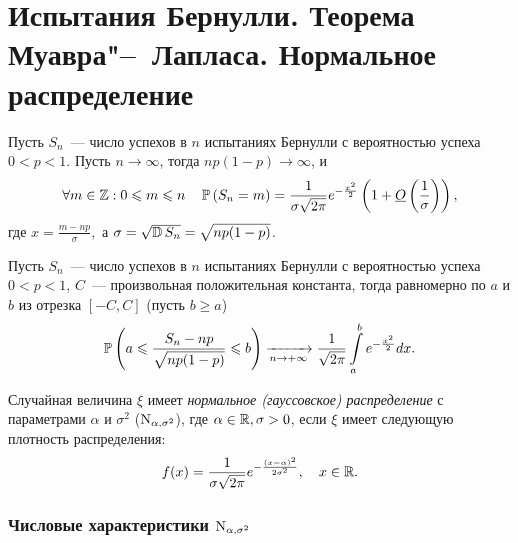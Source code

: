 \section{Испытания Бернулли. Теорема Муавра"--~Лапласа. Нормальное распределение}

\begin{namedthm} 
    Пусть $S_n$~--- число успехов в $n$ испытаниях Бернулли с вероятностью успеха $0 < p < 1$. 
    Пусть $n \to \infty$, тогда $n p(1-p) {\longrightarrow} \infty$, и 
    \begin{equation*}
        \forall m \in \mathbb{Z}: 0 \leqslant m \leqslant n \quad \operatorname{\mathbb{P}}\left(S_{n}=m\right)=\frac{1}{\sigma \sqrt{2 \pi} } e^{-\frac{x^{2}}{2}}\left(1+\underline{O}\left(\frac{1}{\sigma}\right)\right),
    \end{equation*}
    где $x = \frac{m - np}{\sigma},$ а $\sigma=\sqrt{\operatorname{\mathbb{D}} S_{n}}=\sqrt{n p(1-p)}$.
\end{namedthm}  

\begin{namedthm}
    Пусть $S_n$~--- число успехов в $n$ испытаниях Бернулли с вероятностью успеха $0 < p < 1$, $C$~--- произвольная положительная константа, тогда равномерно по $a$ и $b$ из отрезка $[-C,C]$ (пусть $b \geqslant a$)
\begin{equation*}
    \operatorname{\mathbb{P}}\left(a \leqslant \frac{S_{n}-n p}{\sqrt{n p(1-p)}} \leqslant b\right) \xrightarrow[n \to +\infty]{} \frac{1}{\sqrt{2 \pi}} \int\limits_{a}^{b} e^{-\frac{x^{2}}{2}} dx.
\end{equation*}
\end{namedthm} 

\begin{defn}
    Случайная величина $\xi$ имеет \textit{нормальное (гауссовское) распределение} с параметрами $\alpha$ и $\sigma^2$ ($\operatorname{\mathrm{N}}_{\alpha, \sigma^2}$), где $\alpha \in \mathbb{R}, \sigma > 0$, если $\xi$ имеет следующую плотность распределения:
\begin{equation*}
    f(x)=\frac{1}{\sigma \sqrt{2 \pi}} e^{-\frac{(x-\alpha)^{2}}{2 \sigma^{2}}}, \quad x \in \mathbb{R}.
\end{equation*}
\end{defn}

\subsubsection{Числовые характеристики $\operatorname{\mathrm{N}}_{\alpha, \sigma^2}$}

